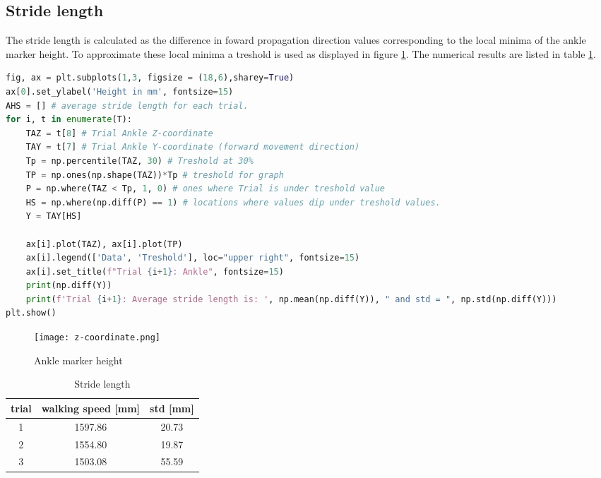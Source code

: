 \documentclass[english, a4paper, 11pt]{article}
\begin{document}
    \subsection{Stride length}

        The stride length is calculated as the difference in foward propagation direction values corresponding to the local minima of the
        ankle marker height. To approximate these local minima a treshold is used as displayed in figure \ref*{fig:height}. The numerical results
        are listed in table \ref*{tab:stride_length}.

        \begin{lstlisting}[language=Python, caption=plotting marker height with treshold and calculating stride length]
fig, ax = plt.subplots(1,3, figsize = (18,6),sharey=True)
ax[0].set_ylabel('Height in mm', fontsize=15)
AHS = [] # average stride length for each trial. 
for i, t in enumerate(T):
    TAZ = t[8] # Trial Ankle Z-coordinate
    TAY = t[7] # Trial Ankle Y-coordinate (forward movement direction)
    Tp = np.percentile(TAZ, 30) # Treshold at 30%
    TP = np.ones(np.shape(TAZ))*Tp # treshold for graph
    P = np.where(TAZ < Tp, 1, 0) # ones where Trial is under treshold value
    HS = np.where(np.diff(P) == 1) # locations where values dip under treshold values. 
    Y = TAY[HS]
            
    ax[i].plot(TAZ), ax[i].plot(TP)
    ax[i].legend(['Data', 'Treshold'], loc="upper right", fontsize=15)
    ax[i].set_title(f"Trial {i+1}: Ankle", fontsize=15)
    print(np.diff(Y))
    print(f'Trial {i+1}: Average stride length is: ', np.mean(np.diff(Y)), " and std = ", np.std(np.diff(Y)))
plt.show()
        \end{lstlisting}

        \begin{figure}[!h]
            \centering
            \texttt{[image: z-coordinate.png]}
            \caption{Ankle marker height}
            \label{fig:height}
        \end{figure}

        \begin{table}[!h]
            \centering
            \begin{tabular}{c|c|c}
                trial & walking speed [mm] & std [mm]\\ \hline
                1 & 1597.86 & 20.73\\
                2 & 1554.80 & 19.87\\
                3 & 1503.08 & 55.59
            \end{tabular}
            \caption{Stride length}
            \label{tab:stride_length}
        \end{table} 
\end{document}
